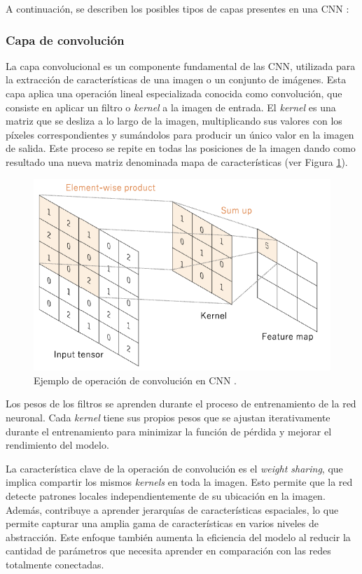 A continuación, se describen los posibles tipos de capas presentes en una CNN \cite{39,40}:


\subsubsection*{Capa de convolución}

La capa convolucional es un componente fundamental de las CNN, utilizada para la extracción de características de una imagen o un conjunto de imágenes. Esta capa aplica una operación lineal especializada conocida como convolución, que consiste en aplicar un filtro o \textit{kernel} a la imagen de entrada. El \textit{kernel} es una matriz que se desliza a lo largo de la imagen, multiplicando sus valores con los píxeles correspondientes y sumándolos para producir un único valor en la imagen de salida. Este proceso se repite en todas las posiciones de la imagen dando como resultado una nueva matriz denominada mapa de características (ver Figura \ref{fig7}).

\begin{figure}[h]
	\centering
	\includegraphics[scale=0.75]{imagenes/cap2/convolution.png}
	\caption[Ejemplo de operación de convolución.]{Ejemplo de operación de convolución en CNN \cite{40}.}
	\label{fig7}
\end{figure}

Los pesos de los filtros se aprenden durante el proceso de entrenamiento de la red neuronal. Cada \textit{kernel} tiene sus propios pesos que se ajustan iterativamente durante el entrenamiento para minimizar la función de pérdida y mejorar el rendimiento del modelo.

La característica clave de la operación de convolución es el \textit{weight sharing}, que implica compartir los mismos \textit{kernels} en toda la imagen. Esto permite que la red detecte patrones locales independientemente de su ubicación en la imagen. Además, contribuye a aprender jerarquías de características espaciales, lo que permite capturar una amplia gama de características en varios niveles de abstracción. Este enfoque también aumenta la eficiencia del modelo al reducir la cantidad de parámetros que necesita aprender en comparación con las redes totalmente conectadas.

